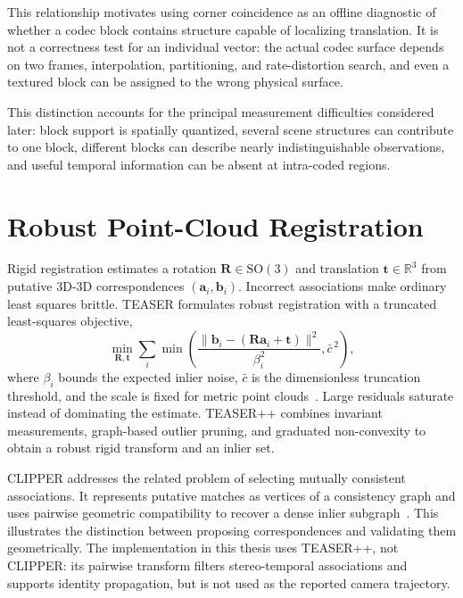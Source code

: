 This relationship motivates using corner coincidence as an offline diagnostic
of whether a codec block contains structure capable of localizing translation.
It is not a correctness test for an individual vector: the actual codec surface
depends on two frames, interpolation, partitioning, and rate-distortion search,
and even a textured block can be assigned to the wrong physical surface.

This distinction accounts for the principal measurement difficulties considered later: block support is spatially quantized, several scene structures can contribute to one block, different blocks can describe nearly indistinguishable observations, and useful temporal information can be absent at intra-coded regions.

\section{Robust Point-Cloud Registration}

Rigid registration estimates a rotation $\mathbf{R}\in\mathrm{SO}(3)$ and translation $\mathbf{t}\in\mathbb{R}^3$ from putative 3D-3D correspondences $(\mathbf{a}_i,\mathbf{b}_i)$. Incorrect associations make ordinary least squares brittle. TEASER formulates robust registration with a truncated least-squares objective,
\begin{equation}
  \min_{\mathbf{R},\mathbf{t}}
  \sum_i \min\!\left(
    \frac{\lVert\mathbf{b}_i-(\mathbf{R}\mathbf{a}_i+\mathbf{t})\rVert^2}
         {\beta_i^2},
    \bar{c}^{\,2}
  \right),
\end{equation}
where $\beta_i$ bounds the expected inlier noise, $\bar c$ is the dimensionless truncation threshold, and the scale is fixed for metric point clouds~\cite{yang2020teaser}. Large residuals saturate instead of dominating the estimate. TEASER++ combines invariant measurements, graph-based outlier pruning, and graduated non-convexity to obtain a robust rigid transform and an inlier set.

CLIPPER addresses the related problem of selecting mutually consistent associations. It represents putative matches as vertices of a consistency graph and uses pairwise geometric compatibility to recover a dense inlier subgraph~\cite{lusk2021clipper}. This illustrates the distinction between proposing correspondences and validating them geometrically. The implementation in this thesis uses TEASER++, not CLIPPER: its pairwise transform filters stereo-temporal associations and supports identity propagation, but is not used as the reported camera trajectory.


